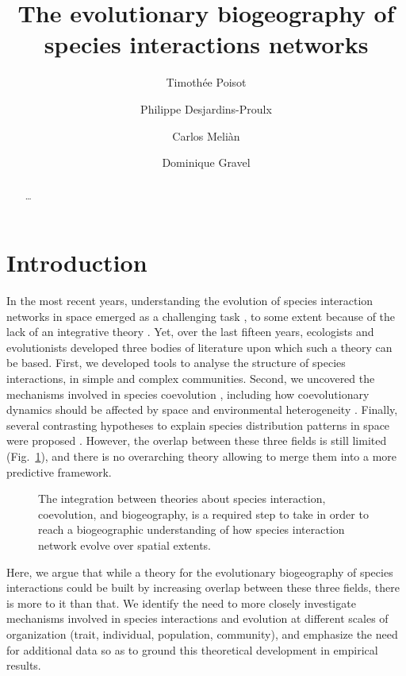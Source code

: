 \documentclass[11pt,oneside]{article}
\title{The evolutionary biogeography of species interactions networks}
\author{
    Timoth\'ee Poisot
        \and
    Philippe Desjardins-Proulx
        \and
    Carlos Meli\`an
        \and
    Dominique Gravel
    }
\begin{document}
\maketitle
\begin{abstract}
	\ldots 
\end{abstract}
\onehalfspacing\clearpage


\section{Introduction}

In the most recent years, understanding the evolution of species interaction
networks in space emerged as a challenging task \parencite{Pillai2011}, to some
extent because of the lack of an integrative theory \parencite{Urban2008}. Yet,
over the last fifteen years, ecologists and evolutionists developed three bodies
of literature upon which such a theory can be based. First, we developed tools
to analyse the structure of species interactions, in simple and complex
communities. Second, we uncovered the mechanisms involved in species coevolution
\parencite{Thompson1994a}, including how coevolutionary dynamics should be
affected by space and environmental heterogeneity \parencite{Thompson2005}.
Finally, several contrasting hypotheses to explain species distribution
patterns in space were proposed \parencite{O'Dwyer2010}. However, the overlap
between these three fields is still limited (Fig.~\ref{f:venn}), and there is
no overarching theory allowing to merge them into a more predictive framework.

\begin{figure}[htbp]
   \centering
   
   \caption{The integration between theories about species interaction,
   coevolution, and biogeography, is a required step to take in order to reach
   a biogeographic understanding of how species interaction network evolve
   over spatial extents.}
   \label{f:venn}
\end{figure}

Here, we argue that while a theory for the evolutionary biogeography of
species interactions could be built by increasing overlap between these three
fields, there is more to it than that. We identify the need to more closely
investigate mechanisms involved in species interactions and evolution at
different scales of organization (trait, individual, population, community),
and emphasize the need for additional data so as to ground this theoretical
development in empirical results.
\end{document}
